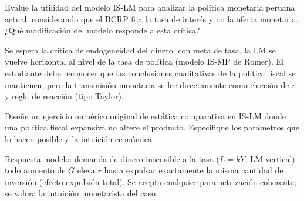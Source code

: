 \documentclass[claves]{evaluacion}
\begin{document}
\begin{pregunta}
Evalúe la utilidad del modelo IS-LM para analizar la política monetaria
peruana actual, considerando que el BCRP fija la tasa de interés y no la
oferta monetaria. ¿Qué modificación del modelo responde a esta crítica?
\begin{solucion}
Se espera la crítica de endogeneidad del dinero: con meta de tasa, la LM
se vuelve horizontal al nivel de la tasa de política (modelo IS-MP de
Romer). El estudiante debe reconocer que las conclusiones cualitativas de
la política fiscal se mantienen, pero la transmisión monetaria se lee
directamente como elección de $r$ y regla de reacción (tipo Taylor).
\end{solucion}
\end{pregunta}

\begin{pregunta}[][Cr · Diseño]
Diseñe un ejercicio numérico original de estática comparativa en IS-LM
donde una política fiscal expansiva no altere el producto. Especifique
los parámetros que lo hacen posible y la intuición económica.
\begin{solucion}
Respuesta modelo: demanda de dinero insensible a la tasa
($L = kY$, LM vertical): todo aumento de $G$ eleva $r$ hasta expulsar
exactamente la misma cantidad de inversión (efecto expulsión total).
Se acepta cualquier parametrización coherente; se valora la intuición
monetarista del caso.
\end{solucion}
\end{pregunta}

\findelexamen
\end{document}

